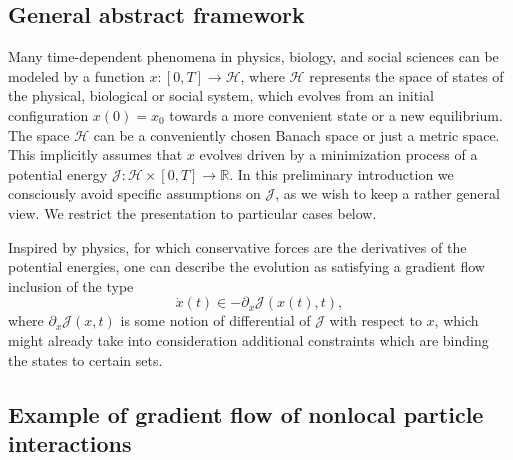 
\subsection{General abstract framework}

Many time-dependent phenomena in physics, biology, and social sciences can be modeled by a function $x:[0,T] \to \mathcal H$, where $\mathcal H$ represents the space of states of the physical, biological or social system, which evolves from an initial configuration $x(0)=x_0$  towards a more convenient state or a new equilibrium. The space $\mathcal H$ can be a conveniently chosen Banach space or just a metric space. 
This implicitly assumes that $x$ evolves driven by a minimization process of a potential energy $\mathcal J: \mathcal H \times [0,T] \to \mathbb R$.  In this preliminary introduction we consciously avoid specific assumptions on  $\mathcal J$, as we wish to keep a rather general view. We restrict the presentation to particular cases below.%

Inspired by physics, for which conservative forces are the derivatives of the potential energies, one can describe the evolution as satisfying a gradient flow inclusion of the type
\begin{equation}\label{gradientflow}
\dot x(t) \in - \partial_x \mathcal J(x(t),t),
\end{equation}
where $\partial_x \mathcal J(x,t)$ is some notion of differential of $\mathcal J$ with respect to $x$, which might already take into consideration additional constraints which are binding the states to certain sets.



\subsection{Example of gradient flow of nonlocal particle interactions}\label{sec:gradflow}

